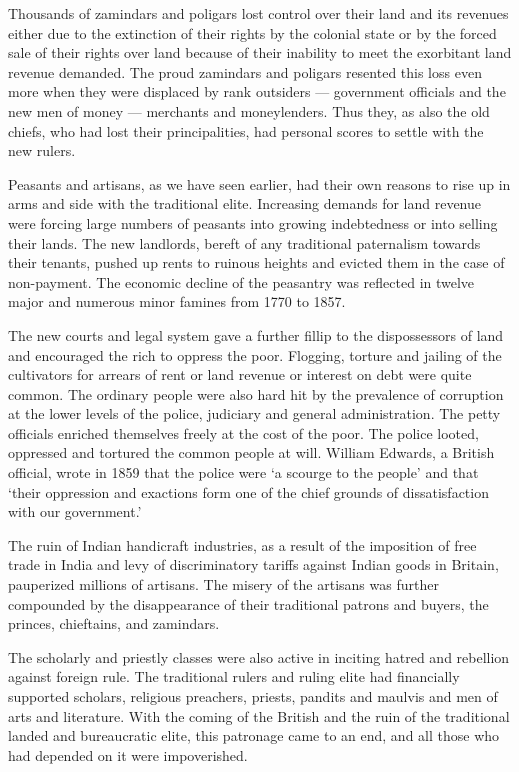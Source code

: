 Thousands of zamindars and poligars lost control over their land and its revenues either due to the extinction of their rights by the colonial state or by the forced sale of their rights over land because of their inability to meet the exorbitant land revenue demanded. The proud zamindars and poligars resented this loss even more when they were displaced by rank outsiders — government officials and the new men of money — merchants and moneylenders. Thus they, as also the old chiefs, who had lost their principalities, had personal scores to settle with the new rulers.

Peasants and artisans, as we have seen earlier, had their own reasons to rise up in arms and side with the traditional elite. Increasing demands for land revenue were forcing large numbers of peasants into growing indebtedness or into selling their lands. The new landlords, bereft of any traditional paternalism towards their tenants, pushed up rents to ruinous heights and evicted them in the case of non-payment. The economic decline of the peasantry was reflected in twelve major and numerous minor famines from 1770 to 1857.

The new courts and legal system gave a further fillip to the dispossessors of land and encouraged the rich to oppress the poor. Flogging, torture and jailing of the cultivators for arrears of rent or land revenue or interest on debt were quite common. The ordinary people were also hard hit by the prevalence of corruption at the lower levels of the police, judiciary and general administration. The petty officials enriched themselves freely at the cost of the poor. The police looted, oppressed and tortured the common people at will. William Edwards, a British official, wrote in 1859 that the police were ‘a scourge to the people’ and that ‘their oppression and exactions form one of the chief grounds of dissatisfaction with our government.’

The ruin of Indian handicraft industries, as a result of the imposition of free trade in India and levy of discriminatory tariffs against Indian goods in Britain, pauperized millions of artisans. The misery of the artisans was further compounded by the disappearance of their traditional patrons and buyers, the princes, chieftains, and zamindars.

The scholarly and priestly classes were also active in inciting hatred and rebellion against foreign rule. The traditional rulers and ruling elite had financially supported scholars, religious preachers, priests, pandits and maulvis and men of arts and literature. With the coming of the British and the ruin of the traditional landed and bureaucratic elite, this patronage came to an end, and all those who had depended on it were impoverished.

